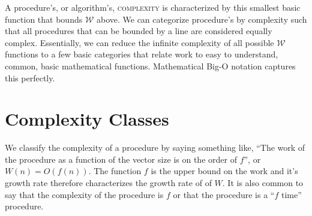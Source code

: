 \documentclass[]{tufte-handout}
\begin{document}
A procedure's, or algorithm's, \textsc{complexity} is characterized by this smallest basic function that bounds $\mathcal{W}$ above. We can categorize procedure's by complexity such that all procedures that can be bounded by a line are considered equally complex. Essentially, we can reduce the infinite complexity of all possible $\mathcal{W}$ functions to a few basic categories that relate work to easy to understand, common, basic mathematical functions. Mathematical Big-O notation captures this perfectly.

\section{Complexity Classes}

We classify the complexity of a procedure by saying something like, ``The work of the procedure as a function of the vector size is on the order of $f$'', or $W(n) = O(f(n))$. The function $f$ is the upper bound on the work and it's growth rate therefore characterizes the growth rate of of $W$. It is also common to say that the complexity of the procedure is $f$ or that the procedure is a ``$f$ time'' procedure.
\end{document}
